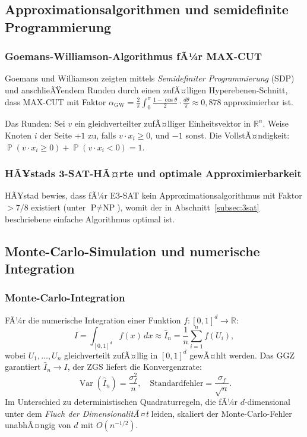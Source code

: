 ﻿\documentclass[12pt,a4paper]{article}
\theoremstyle{definition}
\theoremstyle{plain}
\theoremstyle{remark}
\DeclareMathOperator{\Var}{Var}
\DeclareMathOperator{\Prob}{\mathbb{P}}
\begin{document}
\subsection{Approximationsalgorithmen und semidefinite Programmierung}

\subsubsection{Goemans-Williamson-Algorithmus fÃ¼r MAX-CUT}
Goemans und Williamson \cite{goemans1995improved} zeigten mittels
\emph{Semidefiniter Programmierung} (SDP) und anschlieÃŸendem
Runden durch einen zufÃ¤lligen Hyperebenen-Schnitt, dass MAX-CUT mit
Faktor $\alpha_{\text{GW}} = \frac{2}{\pi}\int_0^\pi \frac{1-\cos\theta}{2}
\cdot \frac{d\theta}{\pi} \approx 0{,}878$ approximierbar ist.

Das Runden: Sei $v$ ein gleichverteilter zufÃ¤lliger Einheitsvektor in $\mathbb{R}^n$.
Weise Knoten $i$ der Seite $+1$ zu, falls $v \cdot x_i \geq 0$, und $-1$ sonst.
Die VollstÃ¤ndigkeit: $\Prob(v \cdot x_i \geq 0) + \Prob(v \cdot x_i < 0) = 1$.

\subsubsection{HÃ¥stads 3-SAT-HÃ¤rte und optimale Approximierbarkeit}
HÃ¥stad \cite{hastad2001some} bewies, dass fÃ¼r E3-SAT kein Approximationsalgorithmus
mit Faktor $> 7/8$ existiert (unter $\text{P}\neq\text{NP}$), womit der
in Abschnitt~\ref{subsec:3sat} beschriebene einfache Algorithmus optimal ist.

\subsection{Monte-Carlo-Simulation und numerische Integration}

\subsubsection{Monte-Carlo-Integration}
FÃ¼r die numerische Integration einer Funktion $f: [0,1]^d \to \mathbb{R}$:
\[
  I = \int_{[0,1]^d} f(x)\,dx \approx \hat{I}_n = \frac{1}{n}\sum_{i=1}^n f(U_i),
\]
wobei $U_1, \ldots, U_n$ gleichverteilt zufÃ¤llig in $[0,1]^d$ gewÃ¤hlt werden.
Das GGZ garantiert $\hat{I}_n \to I$, der ZGS liefert die Konvergenzrate:
\[
  \Var(\hat{I}_n) = \frac{\sigma^2_f}{n}, \quad
  \text{Standardfehler} = \frac{\sigma_f}{\sqrt{n}}.
\]
Im Unterschied zu deterministischen Quadraturregeln, die fÃ¼r $d$-dimensional
unter dem \emph{Fluch der DimensionalitÃ¤t} leiden, skaliert der
Monte-Carlo-Fehler unabhÃ¤ngig von $d$ mit $O(n^{-1/2})$.
\end{document}
